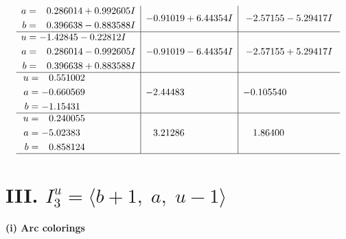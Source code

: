 \documentclass[1p]{elsarticle_modified}
\theoremstyle{definition}
\begin{document}
$$\begin{array}{c|c|c}
\begin{aligned}
a &= \phantom{-}0.286014 + 0.992605 I \\
b &= \phantom{-}0.396638 - 0.883588 I\end{aligned}
 & -0.91019 + 6.44354 I & -2.57155 - 5.29417 I \\ \hline\begin{aligned}
u &= -1.42845 - 0.22812 I \\
a &= \phantom{-}0.286014 - 0.992605 I \\
b &= \phantom{-}0.396638 + 0.883588 I\end{aligned}
 & -0.91019 - 6.44354 I & -2.57155 + 5.29417 I \\ \hline\begin{aligned}
u &= \phantom{-}0.551002\phantom{ +0.000000I} \\
a &= -0.660569\phantom{ +0.000000I} \\
b &= -1.15431\phantom{ +0.000000I}\end{aligned}
 & -2.44483\phantom{ +0.000000I} & -0.105540\phantom{ +0.000000I} \\ \hline\begin{aligned}
u &= \phantom{-}0.240055\phantom{ +0.000000I} \\
a &= -5.02383\phantom{ +0.000000I} \\
b &= \phantom{-}0.858124\phantom{ +0.000000I}\end{aligned}
 & \phantom{-}3.21286\phantom{ +0.000000I} & \phantom{-}1.86400\phantom{ +0.000000I}\\
 \hline 
 \end{array}$$\newpage\newpage\renewcommand{\arraystretch}{1}
\centering \section*{III. $I^u_{3}= \langle b+1,\;a,\;u-1 \rangle$}
\flushleft \textbf{(i) Arc colorings}\\
\end{document}
